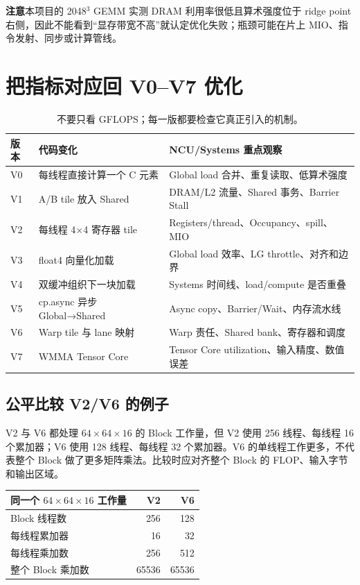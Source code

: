 \documentclass[UTF8,11pt,a4paper,fontset=fandol]{ctexart}
\newcommand{\caution}[1]{\par\noindent\colorbox{PaleOrange}{\parbox{\dimexpr\linewidth-2\fboxsep\relax}{\textbf{注意}\quad #1}}\par}
\newcommand{\pagebreakhere}{\clearpage}
\begin{document}
\caution{本项目的 2048$^3$ GEMM 实测 DRAM 利用率很低且算术强度位于 ridge point 右侧，因此不能看到“显存带宽不高”就认定优化失败；瓶颈可能在片上 MIO、指令发射、同步或计算管线。}

\pagebreakhere
\section{把指标对应回 V0--V7 优化}
\begin{table}[H]\centering\small
\begin{tabularx}{\linewidth}{lX X}
\toprule
版本 & 代码变化 & NCU/Systems 重点观察\\\midrule
V0 & 每线程直接计算一个 C 元素 & Global load 合并、重复读取、低算术强度\\
V1 & A/B tile 放入 Shared & DRAM/L2 流量、Shared 事务、Barrier Stall\\
V2 & 每线程 4×4 寄存器 tile & Registers/thread、Occupancy、spill、MIO\\
V3 & float4 向量化加载 & Global load 效率、LG throttle、对齐和边界\\
V4 & 双缓冲组织下一块加载 & Systems 时间线、load/compute 是否重叠\\
V5 & cp.async 异步 Global→Shared & Async copy、Barrier/Wait、内存流水线\\
V6 & Warp tile 与 lane 映射 & Warp 责任、Shared bank、寄存器和调度\\
V7 & WMMA Tensor Core & Tensor Core utilization、输入精度、数值误差\\
\bottomrule
\end{tabularx}
\caption{不要只看 GFLOPS；每一版都要检查它真正引入的机制。}
\end{table}

\subsection{公平比较 V2/V6 的例子}
V2 与 V6 都处理 $64\times64\times16$ 的 Block 工作量，但 V2 使用 256 线程、每线程 16 个累加器；V6 使用 128 线程、每线程 32 个累加器。V6 的单线程工作更多，不代表整个 Block 做了更多矩阵乘法。比较时应对齐整个 Block 的 FLOP、输入字节和输出区域。

\begin{table}[H]\centering\small
\begin{tabular}{lrr}
\toprule
同一个 $64\times64\times16$ 工作量 & V2 & V6\\\midrule
Block 线程数 & 256 & 128\\
每线程累加器 & 16 & 32\\
每线程乘加数 & 256 & 512\\
整个 Block 乘加数 & 65536 & 65536\\
\bottomrule
\end{tabular}
\end{table}
\end{document}
